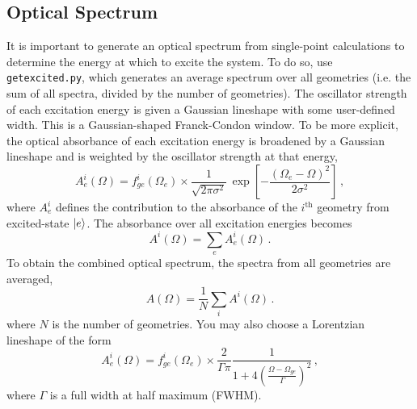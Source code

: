 \documentclass[letterpaper,12pt,titlepage]{article}
\begin{document}
\subsection{Optical Spectrum}
\label{optspec}
It is important to generate an optical spectrum from single-point calculations to determine the energy at which to excite the system.  To do so, use \verb+getexcited.py+, which generates an average spectrum over all geometries (i.e. the sum of all spectra, divided by the number of geometries).  The oscillator strength of each excitation energy is given a Gaussian lineshape with some user-defined width.  This is a Gaussian-shaped Franck-Condon window.  To be more explicit, the optical absorbance of each excitation energy is broadened by a Gaussian lineshape and is weighted by the oscillator strength at that energy,
\begin{equation}
A_{e}^{i}\left(\Omega\right) = f_{ge}^{i}\left(\Omega_{e}\right)\times\frac{1}{\sqrt{2\pi\sigma^{2}}}\,\exp\left[-\frac{\left(\Omega_{e}-\Omega\right)^{2}}{2\sigma^{2}}\right]\,,
\end{equation}
where $A_{e}^{i}$ defines the contribution to the absorbance of the $i^{\text{th}}$ geometry from excited-state $\ket{e}$. The absorbance over all excitation energies becomes
\begin{equation}
A^{i}\left(\Omega\right) = \sum_{e} A_{e}^{i}\left(\Omega\right)\,.
\end{equation}
To obtain the combined optical spectrum, the spectra from all geometries are averaged,
\begin{equation}
A\left(\Omega\right) = \frac{1}{N}\sum_{i} A^{i}\left(\Omega\right)\,.
\end{equation}
where $N$ is the number of geometries.  You may also choose a Lorentzian lineshape of the form
\begin{equation}
A_{e}^{i}\left(\Omega\right) = f_{ge}^{i}\left(\Omega_{e}\right)\times\frac{2}{\Gamma\pi}\frac{1}{1+4\left(\frac{\Omega-\Omega_{ge}}{\Gamma}\right)^{2}}\,,
\end{equation}
where $\Gamma$ is a full width at half maximum (FWHM).
\end{document}
